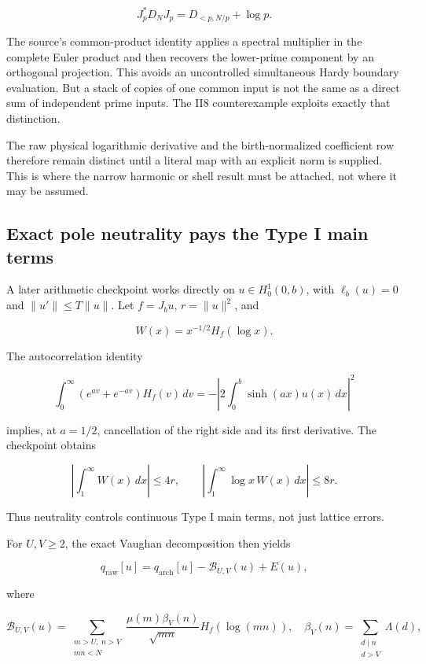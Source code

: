 \documentclass[
  10pt,
  a4paper,
  10pt,
  oneside,
  openany]{book}
\begin{document}
\[
J_p^*D_NJ_p=D_{<p,N/p}+\log p.
\tag{13.9}\label{eq:13.9}
\]

The source's common-product identity applies a spectral multiplier in
the complete Euler product and then recovers the lower-prime component
by an orthogonal projection. This avoids an uncontrolled simultaneous
Hardy boundary evaluation. But a stack of copies of one common input is
not the same as a direct sum of independent prime inputs. The II8
counterexample exploits exactly that distinction.

The raw physical logarithmic derivative and the birth-normalized
coefficient row therefore remain distinct until a literal map with an
explicit norm is supplied. This is where the narrow harmonic or shell
result must be attached, not where it may be assumed.

\subsection{Exact pole neutrality pays the Type I main
terms}\label{exact-pole-neutrality-pays-the-type-i-main-terms}

A later arithmetic checkpoint works directly on \(u\in H_0^1(0,b)\),
with \(\ell_b(u)=0\) and \(\|u'\|\le T\|u\|\). Let \(f=J_bu\),
\(r=\|u\|^2\), and

\[
W(x)=x^{-1/2}H_f(\log x).
\tag{13.10}\label{eq:13.10}
\]

The autocorrelation identity

\[
\int_0^\infty(e^{av}+e^{-av})H_f(v)\,dv
=-\left|2\int_0^b\sinh(ax)u(x)\,dx\right|^2
\tag{13.11}\label{eq:13.11}
\]

implies, at \(a=1/2\), cancellation of the right side and its first
derivative. The checkpoint obtains

\[
\left|\int_1^\infty W(x)\,dx\right|\le4r,
\qquad
\left|\int_1^\infty\log x\,W(x)\,dx\right|\le8r.
\tag{13.12}\label{eq:13.12}
\]

Thus neutrality controls continuous Type I main terms, not just lattice
errors.

For \(U,V\ge2\), the exact Vaughan decomposition then yields

\[
q_{\mathrm{raw}}[u]
=q_{\mathrm{arch}}[u]-\mathcal B_{U,V}(u)+E(u),
\tag{13.13}\label{eq:13.13}
\]

where

\[
\mathcal B_{U,V}(u)
=\sum_{\substack{m>U,\ n>V\\mn<N}}
\frac{\mu(m)\beta_V(n)}{\sqrt{mn}}H_f(\log(mn)),
\quad
\beta_V(n)=\sum_{\substack{d\mid n\\d>V}}\Lambda(d),
\tag{13.14}\label{eq:13.14}
\]
\end{document}
